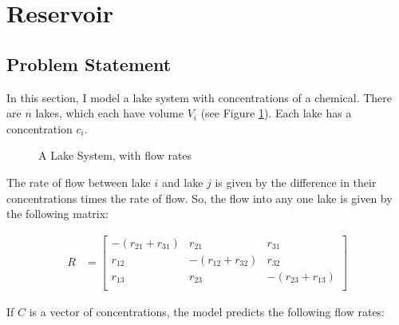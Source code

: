 \documentclass{article}
\begin{document}
\section{Reservoir}

\subsection{Problem Statement}

In this section, I model a lake system with concentrations of a chemical.
There are $n$ lakes, which each have volume $V_i$ (see Figure \ref{fig:lakes}).
Each lake has a concentration $c_i$.

\begin{figure}[h!]
\centering
{}
\caption{A Lake System, with flow rates}
\label{fig:lakes}
\end{figure}

The rate of flow between lake $i$ and lake $j$ is given by the difference in their
	concentrations times the rate of flow.
So, the flow into any one lake is given by the following matrix:

\begin{align}
R & = \left[ \begin{matrix}
	- \left( r_{21} + r_{31} \right) & r_{21} & r_{31} \\
	r_{12} & - \left( r_{12} + r_{32} \right) & r_{32} \\
	r_{13} & r_{23} & - \left( r_{23} + r_{13} \right) \\
\end{matrix} \right] \label{eq:def-of-R} 
\end{align}

If $C$ is a vector of concentrations, the model predicts the following flow rates:
\end{document}
